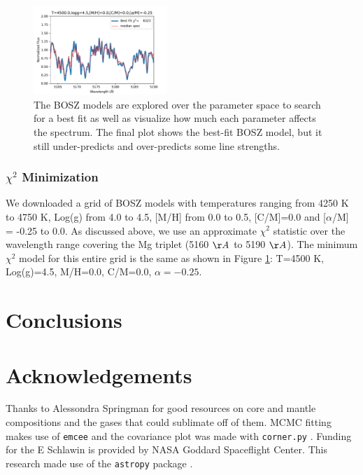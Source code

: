 \documentclass[preprint]{aastex61}
\begin{document}
\begin{figure}[!hbtp]
\begin{centering}
\includegraphics[width=0.45\textwidth]{images/bosz_model_exploration/FINAL_exploration.pdf}
\caption{The BOSZ models are explored over the parameter space to search for a best fit as well as visualize how much each parameter affects the spectrum.
The final plot shows the best-fit BOSZ model, but it still under-predicts and over-predicts some line strengths.}\label{fig:boszModelParamsMedianSpec}
\end{centering}
\end{figure}

\subsubsection{$\chi^2$ Minimization}
We downloaded a grid of BOSZ models with temperatures ranging from 4250 K to 4750 K, Log(g) from 4.0 to 4.5, [M/H] from 0.0 to 0.5, [C/M]=0.0 and [$\alpha$/M] = -0.25 to 0.0.
As discussed above, we use an approximate $\chi^2$ statistic over the wavelength range covering the Mg triplet (5160 $\AA$ to 5190 $\AA$).
The minimum $\chi^2$ model for this entire grid is the same as shown in Figure \ref{fig:boszModelParamsMedianSpec}: T=4500 K, Log(g)=4.5, M/H=0.0, C/M=0.0, $\alpha=-0.25$.

\clearpage

\section{Conclusions}\label{sec:conclusions}

\section{Acknowledgements}
Thanks to Alessondra Springman for good resources on core and mantle compositions and the gases that could sublimate off of them.
MCMC fitting makes use of \texttt{emcee} \citep{foreman-mackey2013emcee} and the covariance plot was made with \texttt{corner.py} \citep{foremanCorner}.
Funding for the E Schlawin is provided by NASA Goddard Spaceflight Center.
This research made use of the \texttt{astropy} package \citep{astropy2013}.
\end{document}

